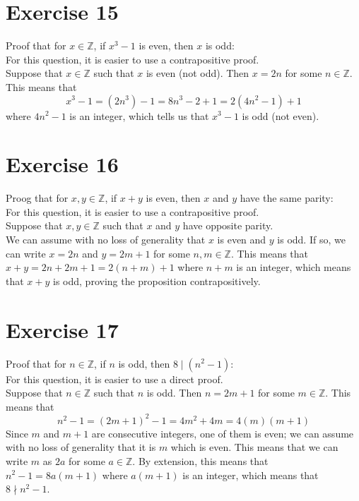 \documentclass[12pt]{article}
\newcommand{\Z}{\mathbb{Z}}
\begin{document}
    \section*{Exercise 15}
    Proof that for $x \in \Z$,
    if $x^3 - 1$ is even, 
    then $x$ is odd: \\
    For this question, it is easier to use a contrapositive proof. \\
    Suppose that $x \in \Z$
    such that $x$ is even (not odd).
    Then $x = 2n$ for some $n \in \Z$.
    This means that
    \[ x^3 - 1 = (2n^3) - 1 = 8n^3 - 2 + 1 = 2(4n^2 - 1) + 1 \]
    where $4n^2 - 1$ is an integer,
    which tells us that $x^3 - 1$ is odd (not even). \\

    \section*{Exercise 16}
    Proog that for $x, y \in \Z$,
    if $x + y$ is even,
    then $x$ and $y$ have the same parity: \\
    For this question, it is easier to use a contrapositive proof. \\
    Suppose that $x, y \in \Z$
    such that $x$ and $y$ have opposite parity. \\
    We can assume with no loss of generality
    that $x$ is even and $y$ is odd. 
    If so, we can write $x = 2n$ and $y = 2m + 1$
    for some $n, m \in \Z$.
    This means that $x + y = 2n + 2m + 1 = 2(n+m) + 1$
    where $n + m$ is an integer,
    which means that $x + y$ is odd,
    proving the proposition contrapositively. \\

    \section*{Exercise 17}
    Proof that for $n \in \Z$,
    if $n$ is odd,
    then $8 \mid (n^2 - 1)$: \\
    For this question, it is easier to use a direct proof. \\
    Suppose that $n \in \Z$
    such that $n$ is odd.
    Then $n = 2m+1$ for some $m \in \Z$.
    This means that
    \[ n^2 - 1 = (2m+1)^2 - 1 = 4m^2 + 4m = 4(m)(m+1) \]
    Since $m$ and $m+1$ are consecutive integers,
    one of them is even;
    we can assume with no loss of generality that it is $m$
    which is even.
    This means that we can write $m$ as $2a$ for some $a \in \Z$.
    By extension, this means that $n^2 - 1 = 8a(m+1)$
    where $a(m+1)$ is an integer,
    which means that $8 \nmid n^2 - 1$. \\
\end{document}
